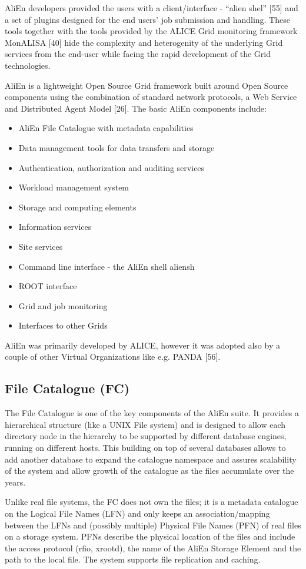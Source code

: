 \documentclass{intech}
\begin{document}
AliEn developers provided the users with a client/interface - ``alien
shel'' [55] and a set of plugins designed for the end users' job
submission and handling. These tools together with the tools
provided by the ALICE Grid monitoring framework MonALISA [40] hide
the complexity and heterogenity of the underlying Grid services from
the end-user while facing the rapid development of the Grid
technologies.

AliEn is a lightweight Open Source Grid framework built around Open
Source components using the combination of standard network
protocols, a Web Service and Distributed Agent Model [26]. The basic
AliEn components include:
%
\begin{itemize}
\item AliEn File Catalogue with metadata capabilities
\item  Data management tools for data transfers and storage
\item Authentication, authorization and auditing services
\item Workload management system
\item Storage and computing elements
\item Information services
\item Site services
\item Command line interface - the AliEn shell aliensh
\item ROOT interface
\item Grid and job monitoring
\item Interfaces to other Grids
\end{itemize}

AliEn was primarily developed by ALICE, however it was adopted also
by a couple of other Virtual Organizations like e.g. PANDA [56].

\subsection{File Catalogue (FC)}
%
The File Catalogue is one of the key components of the AliEn suite.
It provides a hierarchical structure (like a UNIX File system) and
is designed to allow each directory node in the hierarchy to be
supported by different database engines, running on different hosts.
This building on top of several databases allows to add another
database to expand the catalogue namespace and assures scalability
of the system and allow growth of the catalogue as the files
accumulate over the years.

Unlike real file systems, the FC does not own the files; it is a
metadata catalogue on the Logical File Names (LFN) and only keeps an
association/mapping between the LFNs and (possibly multiple)
Physical File Names (PFN) of real files on a storage system. PFNs
describe the physical location of the files and include the access
protocol (rfio, xrootd), the name of the AliEn Storage Element and
the path to the local file. The system supports file replication and
caching.
\end{document}
